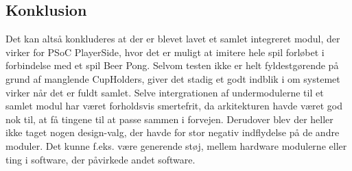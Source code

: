 \documentclass[Integrationstest/Integrationstest_main.tex]{subfiles}
\begin{document}
\subsection{Konklusion}
Det kan altså konkluderes at der er blevet lavet et samlet integreret modul, der virker for PSoC PlayerSide, hvor det er muligt at imitere hele spil forløbet i forbindelse med et spil Beer Pong. Selvom testen ikke er helt fyldestgørende på grund af manglende CupHolders, giver det stadig et godt indblik i om systemet virker når det er fuldt samlet. Selve intergrationen af undermodulerne til et samlet modul har været forholdsvis smertefrit, da arkitekturen havde været god nok til, at få tingene til at passe sammen i forvejen. Derudover blev der heller ikke taget nogen design-valg, der havde for stor negativ indflydelse på de andre moduler. Det kunne f.eks. være generende støj, mellem hardware modulerne eller ting i software, der påvirkede andet software.
\end{document}
